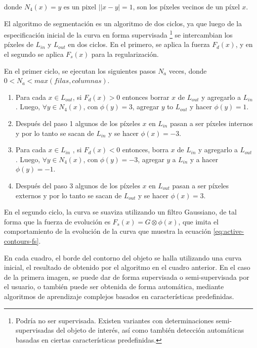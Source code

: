 \documentclass[a4paper,10pt]{article}
\begin{document}
donde $N_{4}(x) = { y \mbox{ es un pixel } | |x-y| = 1}$, son los píxeles vecinos de un píxel $x$.

El algoritmo de segmentación es un algoritmo de dos ciclos, ya que luego de la especificación inicial de la curva en forma supervisada
\footnote{Podría no ser supervisada. Existen variantes con determinaciones semi-supervisadas del objeto de interés, así como también detección automáticas
basadas en ciertas características predefinidas.}
se intercambian los píxeles de $L_{in}$ y $L_{out}$ en dos ciclos. En el primero, se aplica la fuerza $F_{d}(x)$, y en el segundo se aplica $F_{s}(x)$ para la regularización.

En el primer ciclo, se ejecutan los siguientes pasos $N_{a}$ veces, donde $ 0 < N_{a} < max(filas, columnas)$.

\begin{enumerate}
    \item Para cada $x \in L_{out}$, si $F_{d}(x) > 0$ entonces borrar $x$ de $L_{out}$ y agregarlo a $L_{in}$.
    Luego, $\forall y \in N_{4}(x)$, con $\phi(y) = 3$, agregar $y$ to $L_{out}$ y hacer $\phi(y) = 1$.

    \item Después del paso 1 algunos de los píxeles $x$ en $L_{in}$ pasan a ser píxeles internos y por lo tanto 
    se sacan de $L_{in}$ y se hacer $\phi(x) = -3$.

    \item Para cada $x \in L_{in}$ , si $F_{d}(x) < 0$ entonces, borra $x$ de $L_{in}$ y agregarlo a $L_{out}$. Luego, 
     $\forall y \in N_{4}(x)$, con $\phi(y) = -3$, agregar $y$ a $L_{in}$ y a hacer $\phi(y) = -1$.


    \item Después del paso 3 algunos de los píxeles $x$ en $L_{out}$ pasan a ser píxeles externos y por lo tanto 
    se sacan de $L_{out}$ y se hacer $\phi(x) = 3$.
\end{enumerate}


En el segundo ciclo, la curva se suaviza utilizando un filtro Gaussiano, de tal forma que la fuerza de evolución es $F_{s}(x) = G \otimes \phi(x)$, 
que imita el comportamiento de la evolución de la curva que muestra la ecuación \ref{eq:active-contours-fs}.

En cada cuadro, el borde del contorno del objeto se halla utilizando una curva inicial, el resultado de obtenido por el algoritmo en el cuadro anterior. En el 
caso de la primera imagen, se puede dar de forma supervisada o semi-supervisada por el usuario, o también puede ser obtenida de forma automática, mediante 
algoritmos de aprendizaje complejos basados en características predefinidas.
\end{document}

